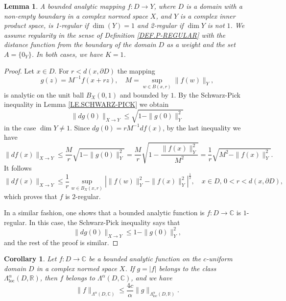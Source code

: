 \documentclass{amsart}
\newtheorem{lemma}[theorem]{Lemma}
\newtheorem{corollary}[theorem]{Corollary}
\theoremstyle{definition}
\numberwithin{equation}{section}
\begin{document}
\begin{lemma}
A bounded analytic mapping $f:D\to Y$, where $D$ is a domain with a non-empty boundary in a complex normed space $X$,
and $Y$ is a complex inner product space, is 1-regular if $\dim(Y)=1$ and 2-regular if $\dim Y$ is not $1$. We assume
regularity in the sense of Definition \ref{DEF.P-REGULAR} with the distance function from the boundary of the domain
$D$ as a weight and the set $A = \{0_Y\}$. In both cases, we have $K=1$.
\end{lemma}

\begin{proof}
Let $x\in D$. For $r<d(x, \partial D)$ the mapping
\begin{equation*}
g( z ) = M ^{-1}f(x + rz),\quad M = \sup_{w\in B(x, r)}\|f(w)\|_Y,
\end{equation*}
is analytic on the unit ball $B_X(0,1)$ and bounded by $1$. By the Schwarz-Pick inequality in Lemma \ref{LE.SCHWARZ-PICK}
we obtain
\begin{equation*}
\|dg (0)\|_{X\to Y}\le \sqrt{1 -\|g(0)\|^2_Y }
\end{equation*}
in the case $\dim Y\not  = 1$. Since  $d g(0) =  r M ^{-1}df(x)$, by the last inequality we have
\begin{equation*}
\|d f (x) \|_{X\to Y} \le \frac {M}r \sqrt{1-\|g(0)\|^2_Y}
=  \frac {M}r \sqrt{1- \frac {\|f(x)\|^2_Y}{M^2}}
= \frac 1r \sqrt{ M^2 -  \|f(x)\|^2_Y} .
\end{equation*}
It follows
\begin{equation*}
\|d f (x) \|_{X\to Y} \le \frac 1 r \sup_{w\in B_X(x,r)} | \|f(w) \|^2_Y  - \| f(x)\|_Y^2|^{\frac 12},
\quad x\in D,\, 0<r<d(x,\partial D),
\end{equation*}
which proves  that  $f$  is $2$-regular.

In a similar fashion, one shows that a bounded analytic function is $f:D \to \mathbb {C}$ is $1$-regular. In this case,
the Schwarz-Pick inequality says that
\begin{equation*}
\|d g (0)\|_{X\to Y}\le  1 -\|g(0)\|^2_Y,
\end{equation*}
and the rest of the proof is similar.
\end{proof}

\begin{corollary}\label{CORO.NORMED.DIM.1}
Let $f:D\to \mathbb{C}$ be a bounded analytic function on the $c$-uniform domain $D$ in a complex normed space $X$. If
$g = |f|$ belongs to the class $\Lambda^{\alpha}_{\mathrm {loc}}(D,\mathbb{R})$, then $f$ belongs to
$\Lambda^{\alpha}(D,\mathbb {C})$, and we have
\begin{equation*}
\|f\|_{\Lambda^{\alpha}(D,\mathbb{C})} \le \frac{4c}\alpha\|g\|_{\Lambda^{{\alpha}}_{\mathrm {loc}}(D,\mathbb{R})}.
\end{equation*}
\end{corollary}
\end{document}
